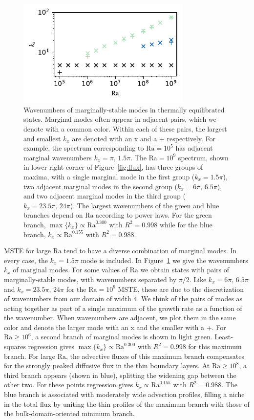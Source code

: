 \documentclass[reprint,amsmath,amssymb,aps,nofootinbib]{revtex4-1}
\newcommand\Ra{\mathrm{Ra}}
\begin{document}
\begin{figure}
    \centering
    \includegraphics[width=3.4in]{kx_m_ra1.pdf}
    \caption{Wavenumbers of marginally-stable modes in thermally equilibrated states. 
    Marginal modes often appear in adjacent pairs, which we denote with a common color. 
    Within each of these pairs, the largest and smallest $k_x$ are denoted with an x and a + respectively.
    For example, the spectrum corresponding to $\Ra = 10^5$ has adjacent marginal wavenumbers $k_x = \pi, \, 1.5\pi$. 
    The $\Ra = 10^9$ spectrum, shown in lower right corner of Figure~\ref{fig:flux}, has three groups of maxima, with a single marginal mode in the first group ($k_x = 1.5\pi$), two adjacent marginal modes in the second group ($k_x = 6\pi, \, 6.5\pi$), and two adjacent marginal modes in the third group ($k_x = 23.5\pi, \, 24\pi$). 
    The largest wavenumbers of the green and blue branches depend on  $\Ra$ according to power laws.
    For the green branch, $\max\{k_x\} \propto \Ra^{0.300}$ with $R^2 = 0.998$ while for the blue branch, $k_x \propto \Ra^{0.155}$ with $R^2 = 0.988$.}
    \label{fig:kx_marginals}
\end{figure}

MSTE for large $\Ra$ tend to have a diverse combination of marginal modes.
In every case, the $k_x = 1.5\pi$ mode is included. 
In Figure~\ref{fig:kx_marginals} we give the wavenumbers $k_x$ of marginal modes. 
For some values of $\Ra$ we obtain states with pairs of marginally-stable modes, with wavenumbers separated by $\pi/2$.
Like $k_x = 6\pi, \, 6.5\pi$ and $k_x=23.5\pi, \, 24\pi$ for the $\Ra=10^9$ MSTE, these are due to the discretization of wavenumbers from our domain of width 4.
We think of the pairs of modes as acting together as part of a single maximum of the growth rate as a function of the wavenumber.
When wavenumbers are adjacent, we plot them in the same color and denote the larger mode with an x and the smaller with a +.
For $\Ra \geq 10^6$, a second branch of marginal modes is shown in light green. 
Least-squares regression gives $\max\{k_x\} \propto \Ra^{0.300}$ with $R^2 = 0.998$ for this maximum branch.
For large $\Ra$, the advective fluxes of this maximum branch compensates for the strongly peaked diffusive flux in the thin boundary layers. 
At $\Ra \geq 10^8$, a third branch appears (shown in blue), splitting the widening gap between the other two. 
For these points regression gives $k_x \propto \Ra^{0.155}$ with $R^2 = 0.988$.
The blue branch is associated with moderately wide advection profiles, filling a niche in the total flux by uniting the thin profiles of the maximum branch with those of the bulk-domain-oriented minimum branch.
\end{document}
